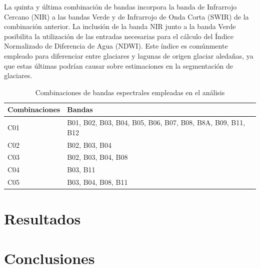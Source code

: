 \documentclass[12pt]{report}
\begin{document}
La quinta y última combinación de bandas incorpora la banda de Infrarrojo Cercano (NIR) a las bandas Verde y de Infrarrojo de Onda Corta (SWIR) de la combinación anterior. La inclusión de la banda NIR junto a la banda Verde posibilita la utilización de las entradas necesarias para el cálculo del Índice Normalizado de Diferencia de Agua (NDWI). Este índice es comúnmente empleado para diferenciar entre glaciares y lagunas de origen glaciar aledañas, ya que estas últimas podrían causar sobre estimaciones en la segmentación de glaciares.
 
\begin{table}[H]
   \centering
   \caption{Combinaciones de bandas espectrales empleadas en el análisis}
   \begin{tabularx}{1\textwidth}{lX} 
\hline
\textbf{Combinaciones} & \textbf{Bandas} \\
\hline
C01 & B01, B02, B03, B04, B05, B06, B07, B08, B8A, B09, B11, B12 \\
C02 & B02, B03, B04 \\
C03 & B02, B03, B04, B08 \\
C04 & B03, B11 \\
C05 & B03, B04, B08, B11 \\
\hline
\end{tabularx}
\label{tab:CombinacionesBandasEspectrales}
\end{table}



\chapter{Resultados}

\chapter{Conclusiones}



\end{document}
